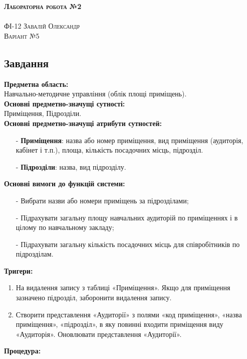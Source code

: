 \documentclass[a4paper,12pt]{article}
\begin{document}
	
		\begin{center}
		{\Large \bfseries \textsc{Лабораторна робота №2}}\\
		\hrulefill\\
		\Large \textsc{ФІ-12 Завалій Олександр\\ Варіант №5}
	\end{center}
	\begin{center}
		\section*{\bfseries{Завдання}}
	\end{center} 
	\textbf{Предметна область:} \\
	Навчально-методичне управління (облік площі приміщень). \\
	\textbf{Основні предметно-значущі сутності:} \\
	Приміщення, Підрозділи. \\
	\textbf{Основні предметно-значущі атрибути сутностей:}
	\begin{enumerate}
		\item[-] \textbf{Приміщення}: назва або номер приміщення, вид приміщення (аудиторія, кабінет і т.п.), площа, кількість посадочних місць, підрозділ. 
		\item[-] \textbf{Підрозділи}: назва, вид підрозділу.
	\end{enumerate}
	\textbf{Основні вимоги до функцій системи:}
	\begin{enumerate}
		\item[-] Вибрати назви або номери приміщень за підрозділами;
		\item[-] Підрахувати загальну площу навчальних аудиторій по приміщеннях і в цілому по навчальному закладу;
		\item[-] Підрахувати загальну кількість посадочних місць для співробітників по підрозділам.
	\end{enumerate}
	\textbf{Тригери:}
	\begin{enumerate}
		\item На видалення запису з таблиці «Приміщення». Якщо для приміщення зазначено підрозділ, заборонити видалення запису.
		\item Створити представлення «Аудиторії» з полями «код приміщення», «назва приміщення», «підрозділ», в яку повинні входити приміщення виду «Аудиторія». Оновлювати представлення «Аудиторії».
	\end{enumerate}
	\textbf{Процедура:}\\
\end{document}
